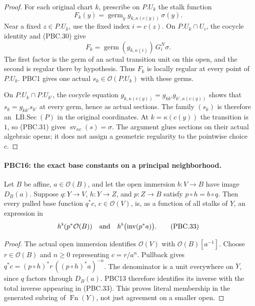 \begin{proof}
For each original chart $k$, prescribe on $P.U_k$ the stalk function
\[
 F_k(y)=
   \operatorname{germ}_y g_{k,\kappa(c(y))}\,\sigma(y).
                                                        \tag{PBC.31}
\]
Near a fixed $z\in P.U_k$, use the fixed index $i=c(z)$.
On $P.U_k\cap U_i$, the cocycle identity and (PBC.30) give
\[
 F_k=
   \operatorname{germ}(g_{k,\kappa(i)})\,G_i^N\sigma.
                                                        \tag{PBC.32}
\]
The first factor is the germ of an actual transition unit on
this open, and the second is regular there by hypothesis.
Thus $F_k$ is locally regular at every point of $P.U_k$.
PBC1 gives one actual $s_k\in\mathcal O(P.U_k)$ with these germs.

On $P.U_k\cap P.U_{k'}$, the cocycle equation
$g_{k,\kappa(c(y))}=g_{kk'}g_{k',\kappa(c(y))}$
shows that $s_k=g_{kk'}s_{k'}$ at every germ, hence as
actual sections.  The family $(s_k)$ is therefore an
$\operatorname{LB.Sec}(P)$ in the original coordinates.
At $k=\kappa(c(y))$ the transition is $1$, so (PBC.31)
gives $\operatorname{sv}_{\kappa c}(s)=\sigma$.
The argument glues sections on their actual algebraic opens;
it does not assign a geometric regularity to the pointwise
choice $c$.
\end{proof}

\paragraph{PBC16: the exact base constants on a principal neighborhood.}
\label{claim:PBC16}
Let $B$ be affine, $a\in\mathcal O(B)$, and let the open
immersion $b:V\to B$ have image $D_B(a)$.  Suppose
$q:Y\to V$, $h:Y\to Z$, and $p:Z\to B$ satisfy
$p\circ h=b\circ q$.  Then every pulled base function
$q^*c$, $c\in\mathcal O(V)$, is, as a function of all
stalks of $Y$, an expression in
\[
 h^\flat(p^*\mathcal O(B))
       \quad\hbox{and}\quad
 h^\flat\bigl(\operatorname{inv}(p^*a)\bigr).
                                                        \tag{PBC.33}
\]

\begin{proof}
The actual open immersion identifies
$\mathcal O(V)$ with $\mathcal O(B)[a^{-1}]$.
Choose $r\in\mathcal O(B)$ and $n\ge0$ representing $c=r/a^n$.
Pullback gives
$q^*c=(p\circ h)^*r\,((p\circ h)^*a)^{-n}$.
The denominator is a unit everywhere on $Y$, since $q$ factors
through $D_B(a)$.  PBC13 therefore identifies its inverse with
the total inverse appearing in (PBC.33).
This proves literal membership in the generated subring of
$\operatorname{Fn}(Y)$, not just agreement on a smaller open.
\end{proof}

